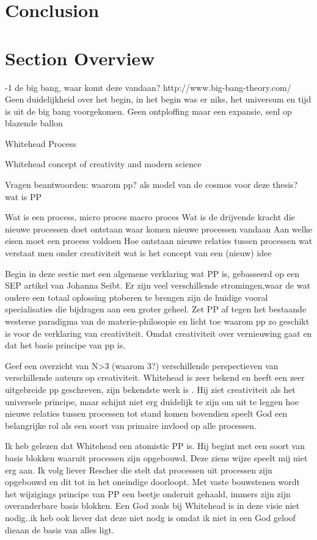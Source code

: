 \documentclass[a4paper]{Thesis}
\begin{document}
\section{Conclusion}
\section{Section Overview}

-1 de big bang, waar komt deze vandaan?
http://www.big-bang-theory.com/
Geen duidelijkheid over het begin, in het begin was er niks, het universum en tijd is uit de big bang voorgekomen.
Geen ontploffing maar een expansie, senl op blazende ballon

Whitehead
Process

Whitehead concept of creativity and modern science




Vragen beantwoorden:
waarom pp? als model van de cosmos voor deze thesis?
wat is PP

Wat is een process, micro proces macro proces
Wat is de drijvende kracht die nieuwe processen doet ontstaan
waar komen nieuwe processen vandaan
Aan welke eisen moet een process voldoen
Hoe ontstaan nieuwe relaties tussen processen
wat verstaat men onder creativiteit
wat is het concept van een (nieuw) idee

Begin in deze sectie met een algemene verklaring wat PP is, gebasseerd op een SEP artikel van Johanna Seibt. Er zijn veel verschillende stromingen,waar de wat oudere een totaal oplossing ptoberen te brengen zijn de huidige vooral specialisaties die bijdragen aan een groter geheel.
Zet PP af tegen het bestaande westerse paradigma van de materie-philosopie en licht toe waarom pp zo geschikt is voor de verklaring van creativiteit. Omdat creativiteit over vernieuwing gaat en dat het basis principe van pp is.

Geef een overzicht van N>3 (waarom 3?) verschillende perspectieven van verschillende auteurs op creativiteit. Whitehead is zeer bekend en heeft een zeer uitgebreide pp geschreven, zijn bekendste werk is \cite{whitehead1929process}. Hij ziet creativiteit als het universele principe, maar schijnt niet erg duidelijk te zijn om uit te leggen hoe nieuwe relaties tussen processen tot stand komen bovendien speelt God een belangrijke rol als een soort van primaire invloed op alle processen.

Ik heb gelezen dat Whitehead een atomistic PP is. Hij begint met een soort van basis blokken waaruit processen zijn opgebouwd. Deze ziens wijze speelt mij niet erg aan. Ik volg liever Rescher die stelt dat processen uit processen zijn opgebouwd en dit tot in het oneindige doorloopt. Met vaste bouwstenen wordt het wijzigings principe van PP een beetje onderuit gehaald, immers zijn zijn overanderbare basis blokken. Een God zoals bij Whitehead is in deze visie niet nodig..ik heb ook liever dat deze niet nodg is omdat ik niet in een God geloof dieaan de basis van alles ligt.
\end{document}
